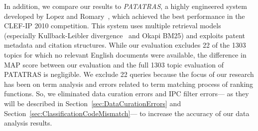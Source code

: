 In addition, we compare our results to \textit{PATATRAS}, a highly engineered system developed by Lopez and Romary~\cite{lopez2010experiments}, which achieved the best performance in the CLEF-IP 2010 competition. This system uses multiple retrieval models (especially Kullback-Leibler divergence~\cite{Baeza-Yates2011} and Okapi BM25) and exploits patent metadata and citation structures.  While our evaluation excludes 22 of the 1303 topics for which no relevant English documents were available, the difference in MAP score between our evaluation and the full 1303 topic evaluation of PATATRAS is negligible. We exclude 22 queries because the focus of our research has been on term analysis and errors related to term matching process of ranking functions. So, we eliminated data curation errors and IPC filter errors--- as they will be described in Section~\ref{sec:DataCurationErrors} and Section~\ref{sec:ClassificationCodeMismatch}--- to increase the accuracy of our data analysis results. 
% 

